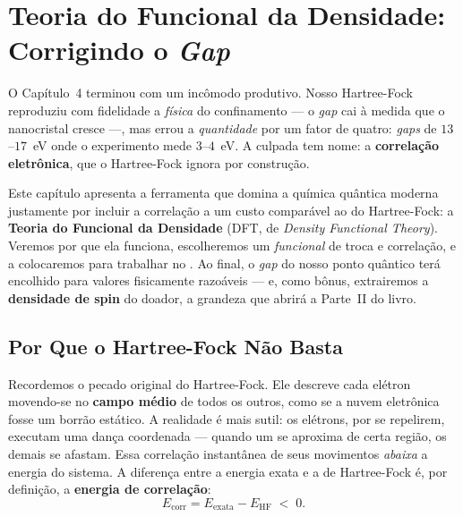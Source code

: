 \chapter{Teoria do Funcional da Densidade: Corrigindo o \emph{Gap}}
\label{cap:dft}

O Capítulo~4 terminou com um incômodo produtivo. Nosso Hartree-Fock reproduziu
com fidelidade a \emph{física} do confinamento --- o \emph{gap} cai à medida que o
nanocristal cresce ---, mas errou a \emph{quantidade} por um fator de quatro:
\emph{gaps} de $13$--$17$~eV onde o experimento mede $3$--$4$~eV. A culpada tem
nome: a \textbf{correlação eletrônica}, que o Hartree-Fock ignora por construção.

Este capítulo apresenta a ferramenta que domina a química quântica moderna
justamente por incluir a correlação a um custo comparável ao do Hartree-Fock: a
\textbf{Teoria do Funcional da Densidade} (DFT, de \emph{Density Functional
Theory}). Veremos por que ela funciona, escolheremos um \emph{funcional} de troca
e correlação, e a colocaremos para trabalhar no \pyscf{}. Ao final, o \emph{gap}
do nosso ponto quântico terá encolhido para valores fisicamente razoáveis --- e,
como bônus, extrairemos a \textbf{densidade de spin} do doador, a grandeza que
abrirá a Parte~II do livro.

\section{Por Que o Hartree-Fock Não Basta}
\label{sec:porquedft}

Recordemos o pecado original do Hartree-Fock. Ele descreve cada elétron movendo-se
no \textbf{campo médio} de todos os outros, como se a nuvem eletrônica fosse um
borrão estático. A realidade é mais sutil: os elétrons, por se repelirem, executam
uma dança coordenada --- quando um se aproxima de certa região, os demais se
afastam. Essa correlação instantânea de seus movimentos \emph{abaixa} a energia do
sistema. A diferença entre a energia exata e a de Hartree-Fock é, por definição, a
\textbf{energia de correlação}:
\begin{equation}
  E_{\text{corr}} = E_{\text{exata}} - E_{\text{HF}} \;<\; 0.
  \label{eq:ecorr}
\end{equation}

